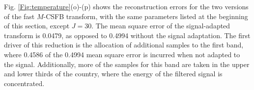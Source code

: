 \documentclass[journal, 10pt]{IEEEtran}
\begin{document}
Fig. \ref{Fig:temperature}(o)-(p) shows the reconstruction errors for the two versions of the fast $M$-CSFB transform, with the same parameters listed at the beginning of this section, except $J=30$. The mean square error of the signal-adapted transform is 0.0479, as opposed to 0.4994 without the signal adaptation. The first driver of this reduction is the allocation of additional samples to the first band, where 0.4586 of the 0.4994 mean square error is incurred when not adapted to the signal. Additionally, more of the samples for this band are taken in the upper and lower thirds of the country, where the energy of the filtered signal is concentrated. %


\end{document}

